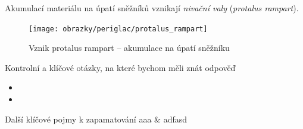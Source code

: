 Akumulací materiálu na úpatí sněžníků vznikají \emph{nivační valy} (\textit{protalus rampart}).
\begin{figure}
	\centering
	\texttt{[image: obrazky/periglac/protalus\_rampart]}
	\caption{Vznik protalus rampart -- akumulace na úpatí sněžníku}
	\label{fig:protalusrampart}
\end{figure}


\newpage
\onecolumn
\begin{boxotazky}{Kontrolní a klíčové otázky, na které bychom měli znát odpověď}
	\begin{itemize}
		\item 
		\item 
		
	\end{itemize}
\end{boxotazky}

\begin{boxslovnik}{Další klíčové pojmy k zapamatování}
	aaa & adfasd \\
	
\end{boxslovnik}
\twocolumn